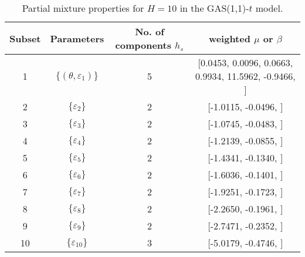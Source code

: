 \begin{table}[h] 
\centering 
\caption{Partial mixture properties for $H=10$ in the GAS(1,1)-$t$ model.} 
\label{tab:pmits_t_gas} 
\begin{tabular}{cccc}  
 Subset & Parameters& No. of components $h_{s}$ & weighted $\mu$ or $\beta$  \\ \hline 
1 & $\{(\theta,\varepsilon_{1})\}$ & 5 & [0.0453, 0.0096, 0.0663, 0.9934, 11.5962, -0.9466, ]   \\ [1ex] 
2 & $\{\varepsilon_{2}\}$ & 2 & [-1.0115, -0.0496, ]   \\ [1ex] 
3 & $\{\varepsilon_{3}\}$ & 2 & [-1.0745, -0.0483, ]   \\ [1ex] 
4 & $\{\varepsilon_{4}\}$ & 2 & [-1.2139, -0.0855, ]   \\ [1ex] 
5 & $\{\varepsilon_{5}\}$ & 2 & [-1.4341, -0.1340, ]   \\ [1ex] 
6 & $\{\varepsilon_{6}\}$ & 2 & [-1.6036, -0.1401, ]   \\ [1ex] 
7 & $\{\varepsilon_{7}\}$ & 2 & [-1.9251, -0.1723, ]   \\ [1ex] 
8 & $\{\varepsilon_{8}\}$ & 2 & [-2.2650, -0.1961, ]   \\ [1ex] 
9 & $\{\varepsilon_{9}\}$ & 2 & [-2.7471, -0.2352, ]   \\ [1ex] 
10 & $\{\varepsilon_{10}\}$ & 3 & [-5.0179, -0.4746, ]   \\ [1ex] 
\hline 
\end{tabular} 
\end{table} 
